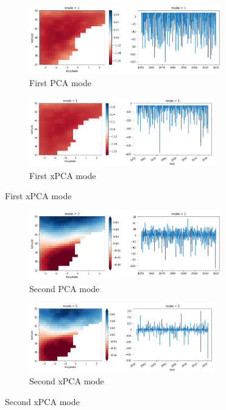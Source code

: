 \documentclass[11pt, oneside]{book}
\theoremstyle{plain}
\theoremstyle{remark}
\begin{document}
\begin{figure}[h!]
\centering
\begin{subfigure}{.5\textwidth}
    \centering
    \includegraphics[width=.95\linewidth, height=3cm]{vlc-mode1}
    \caption{First PCA mode}
\end{subfigure}%
\begin{subfigure}{.5\textwidth}
    \centering
    \includegraphics[width=.95\linewidth, height=3cm]{vlc-tran-mode1}
    \caption{First xPCA mode}
\end{subfigure}
\end{figure}
\begin{figure}[h!]
\centering
\begin{subfigure}{.5\textwidth}
    \centering
    \includegraphics[width=.95\linewidth, height=3cm]{vlc-mode2}
    \caption{Second PCA mode}
\end{subfigure}%
\begin{subfigure}{.5\textwidth}
    \centering
    \includegraphics[width=.95\linewidth, height=3cm]{vlc-tran-mode2}
    \caption{Second xPCA mode}
\end{subfigure}
\end{figure}
\end{document}
